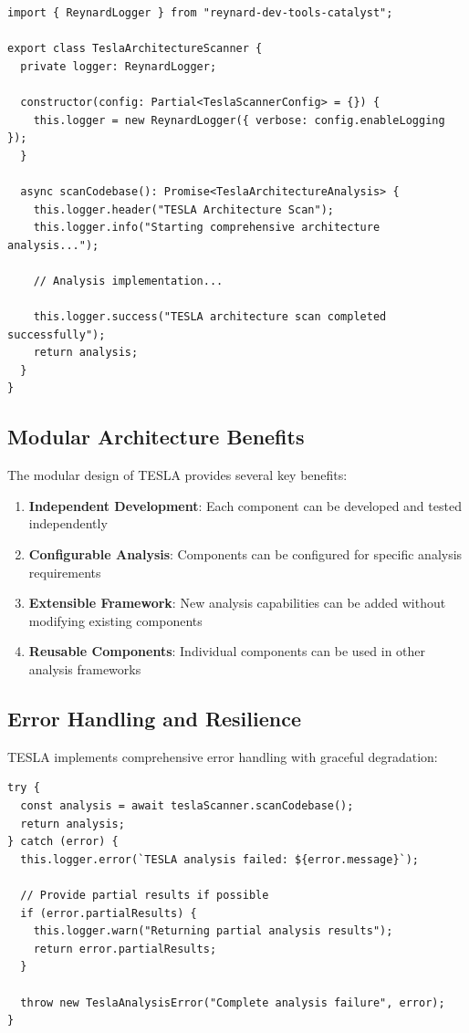 \documentclass[10pt]{article}
\begin{document}
\begin{lstlisting}[caption={TESLA-Catalyst Integration}]
import { ReynardLogger } from "reynard-dev-tools-catalyst";

export class TeslaArchitectureScanner {
  private logger: ReynardLogger;

  constructor(config: Partial<TeslaScannerConfig> = {}) {
    this.logger = new ReynardLogger({ verbose: config.enableLogging });
  }

  async scanCodebase(): Promise<TeslaArchitectureAnalysis> {
    this.logger.header("TESLA Architecture Scan");
    this.logger.info("Starting comprehensive architecture analysis...");
    
    // Analysis implementation...
    
    this.logger.success("TESLA architecture scan completed successfully");
    return analysis;
  }
}
\end{lstlisting}

\subsection{Modular Architecture Benefits}

The modular design of TESLA provides several key benefits:

\begin{enumerate}
    \item \textbf{Independent Development}: Each component can be developed and tested independently
    \item \textbf{Configurable Analysis}: Components can be configured for specific analysis requirements
    \item \textbf{Extensible Framework}: New analysis capabilities can be added without modifying existing components
    \item \textbf{Reusable Components}: Individual components can be used in other analysis frameworks
\end{enumerate}

\subsection{Error Handling and Resilience}

TESLA implements comprehensive error handling with graceful degradation:

\begin{lstlisting}[caption={TESLA Error Handling}]
try {
  const analysis = await teslaScanner.scanCodebase();
  return analysis;
} catch (error) {
  this.logger.error(`TESLA analysis failed: ${error.message}`);
  
  // Provide partial results if possible
  if (error.partialResults) {
    this.logger.warn("Returning partial analysis results");
    return error.partialResults;
  }
  
  throw new TeslaAnalysisError("Complete analysis failure", error);
}
\end{lstlisting}
\end{document}
